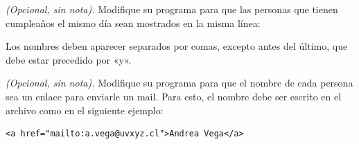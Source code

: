 \documentclass[12pt,spanish]{article}
\begin{document}
  \newpage

  \emph{(Opcional, sin nota).}
  Modifique su programa para que
  las personas que tienen cumpleaños el mismo día
  sean mostrados en la misma línea:

  

  Los nombres deben aparecer separados por comas,
  excepto antes del último,
  que debe estar precedido por «y».

  \emph{(Opcional, sin nota).}
  Modifique su programa para que el nombre de cada persona
  sea un enlace para enviarle un mail.
  Para esto, el nombre debe ser escrito en el archivo
  como en el siguiente ejemplo:
  \begin{lstlisting}
<a href="mailto:a.vega@uvxyz.cl">Andrea Vega</a>
  \end{lstlisting}
\end{document}
